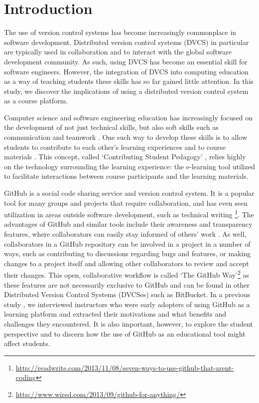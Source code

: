 \section{Introduction}


The use of version control systems has become increasingly commonplace in software development. Distributed version control systems (DVCS) in particular are typically used in collaboration and to interact with the global software development community. As such, using DVCS has become an essential skill for software engineers. However, the integration of DVCS into computing education as a way of teaching students these skills has so far gained little attention. In this study, we discover the implications of using a distributed version control system as a course platform.

Computer science and software engineering education has increasingly focused on the development of not just technical skills, but also soft skills such as communication and teamwork \cite{jazayeri2004education}. One such way to develop these skills is to allow students to contribute to each other's learning experiences and to course materials \cite{falkner2012supporting}. This concept, called `Contributing Student Pedagogy' \cite{hamer2008contributing}, relies highly on the technology surrounding the learning experience: the e-learning tool utilized to facilitate interactions between course participants and the learning materials.

GitHub is a social code sharing service and version control system. It is a popular tool for many groups and projects that require collaboration, and has even seen utilization in areas outside software development, such as technical writing \footnote{\url{http://readwrite.com/2013/11/08/seven-ways-to-use-github-that-arent-coding}}. The advantages of GitHub and similar tools include their awareness and transparency features, where collaborators can easily stay informed of others' work \cite{dabbish2012social}. As well, collaborators in a GitHub repository can be involved in a project in a number of ways, such as contributing to discussions regarding bugs and features, or making changes to a project itself and allowing other collaborators to review and accept their changes. This open, collaborative workflow is called `The GitHub Way'\footnote{\url{http://www.wired.com/2013/09/github-for-anything/}} as these features are not necessarily exclusive to GitHub and can be found in other Distributed Version Control Systems (DVCSes) such as BitBucket. In a previous study \cite{Zagalsky}, we interviewed instructors who were early adopters of using GitHub as a learning platform and extracted their motivations and what benefits and challenges they encountered. It is also important, however, to explore the student perspective and to discern how the use of GitHub as an educational tool might affect students.


